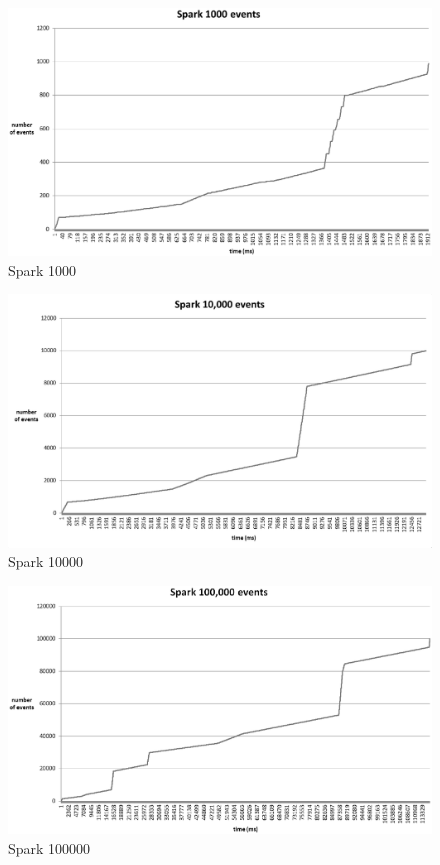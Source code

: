 \begin{figure}
  \centering
  \includegraphics [width=1.0\textwidth]{images/spark1000}
  \caption{Spark 1000}
  \label{fig:spark1000}
\end{figure}

\begin{figure}
  \centering
  \includegraphics [width=1.0\textwidth]{images/spark10000}
  \caption{Spark 10000}
  \label{fig:spark10000}
\end{figure}

\begin{figure}
  \centering
  \includegraphics [width=1.0\textwidth]{images/spark100000}
  \caption{Spark 100000}
  \label{fig:spark100000}
\end{figure}



